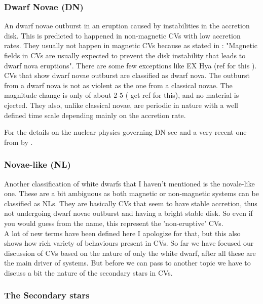 \subsubsection{Dwarf Novae (DN)}

An dwarf novae outburst in an eruption caused by instabilities in the accretion disk. This is predicted to happened in non-magnetic CVs with low accretion rates. They usually not happen in magnetic CVs because as stated in \cite{shara_erupting_2005}: "Magnetic fields in CVs are usually expected to prevent the disk instability that leads to dwarf nova eruptions". There are some few exceptions like EX Hya (ref for this \cite{a}). CVs that show dwarf novae outburst are classified as dwarf nova. The outburst from a dwarf nova is not as violent as the one from a classical novae. The magnitude change is only of about 2-5 (\cite{ref} get ref for this), and no material is ejected. They also, unlike classical novae, are periodic in nature with a well defined time scale depending mainly on the accretion rate.  

For the details on the nuclear physics governing DN see\cite{shara_recent_1989} and a very recent one from \citeyear{starrfield_thermonuclear_2016} by \citeauthor{starrfield_thermonuclear_2016}. \\



\subsubsection{Novae-like (NL)}

Another classification of white dwarfs that I haven't mentioned is the novale-like one. These are a bit ambiguous as both magnetic or non-magnetic systems can be classified as NLs. They are basically CVs that seem to have stable accretion, thus not undergoing dwarf novae outburst and having a bright stable disk. So even if you would guess from the name, this represent the 'non-eruptive' CVs. \\

A lot of new terms have been defined here I apologize for that, but this also shows how rich variety of behaviours present in CVs. So far we have focused our discussion of CVs based on the nature of only the white dwarf, after all these are the main driver of systems. But before we can pass to another topic we have to discuss a bit the nature of the secondary stars in CVs. 


\subsubsection{The Secondary stars}

